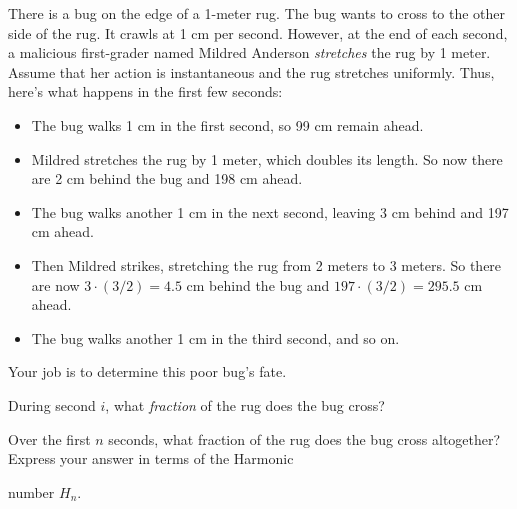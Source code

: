 \documentclass[12pt,twoside]{article}
\begin{document}
\begin{problem}
There is a bug on the edge of a 1-meter rug.  The bug wants to cross
to the other side of the rug.  It crawls at 1 cm per second.  However,
at the end of each second, a malicious first-grader named Mildred
Anderson \textit{stretches} the rug by 1 meter.  Assume that her
action is instantaneous and the rug stretches uniformly.  Thus, here's
what happens in the first few seconds:

\begin{itemize}

\item The bug walks 1 cm in the first second, so 99 cm remain ahead.

\item Mildred stretches the rug by 1 meter, which doubles its length.
So now there are 2 cm behind the bug and 198 cm ahead.

\item The bug walks another 1 cm in the next second, leaving 3 cm
behind and 197 cm ahead.

\item Then Mildred strikes, stretching the rug from 2 meters to 3
meters.  So there are now $3 \cdot (3 / 2) = 4.5$ cm behind the bug
and $197 \cdot (3/2) = 295.5$ cm ahead.

\item The bug walks another 1 cm in the third second, and so on.

\end{itemize}

Your job is to determine this poor bug's fate.

\bparts

\item During second $i$, what \textit{fraction} of the rug does the
bug cross?


\item Over the first $n$ seconds, what fraction of the rug does the
bug cross altogether?  Express your answer in terms of the Harmonic

number $H_n$.



\end{problem}
\end{document}
